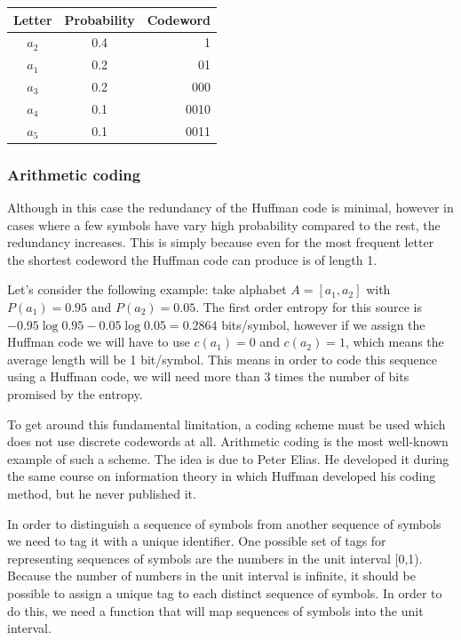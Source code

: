       \begin{table}
        \centering
        \begin{tabular}{ccr}
          \toprule
          Letter & Probability & Codeword \\
          \midrule
          $a_2$ & 0.4 & 1 \\
          $a_1$ & 0.2 & 01 \\
          $a_3$ & 0.2 & 000 \\
          $a_4$ & 0.1 & 0010 \\
          $a_5$ & 0.1 & 0011 \\
          \bottomrule
        \end{tabular}
        \label{tab:huffman2}
      \end{table}


    \subsubsection{Arithmetic coding}
      Although in this case the redundancy of the Huffman code is minimal, however in cases where a few symbols have vary high probability compared to the rest, the redundancy increases. This is simply because even for the most frequent letter the shortest codeword the Huffman code can produce is of length 1.

      Let's consider the following example: take alphabet $A=[a_1, a_2]$ with $P(a_1) = 0.95$ and $P(a_2) = 0.05$. The first order entropy for this source is $-0.95 \log 0.95 - 0.05 \log 0.05 = 0.2864$ bits/symbol, however if we assign the Huffman code we will have to use $c(a_1)=0$ and $c(a_2)=1$, which means the average length will be 1 bit/symbol. This means in order to code this sequence using a Huffman code, we will need more than 3 times the number of bits promised by the entropy.

      To get around this fundamental limitation, a coding scheme must be used which does not use discrete codewords at all. Arithmetic coding is the most well-known example of such a scheme. The idea is due to Peter Elias. He developed it during the same course on information theory in which Huffman developed his coding method, but he never published it.

      In order to distinguish a sequence of symbols from another sequence of symbols we need to
      tag it with a unique identifier. One possible set of tags for representing sequences of symbols
      are the numbers in the unit interval [0,1). Because the number of numbers in the unit interval
      is infinite, it should be possible to assign a unique tag to each distinct sequence of symbols. In
      order to do this, we need a function that will map sequences of symbols into the unit interval.

